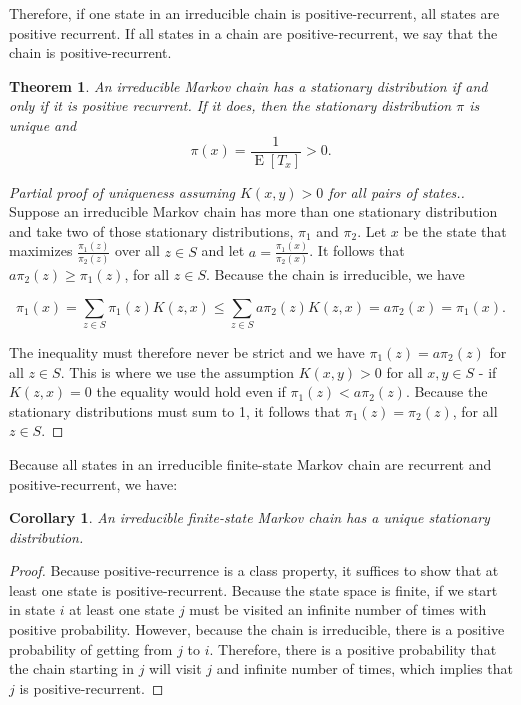 \documentclass{book}
\theoremstyle{plain}%
\newtheorem{theorem}{Theorem}[section]
\newtheorem{corollary}{Corollary}[section]
\theoremstyle{definition}
\DeclareMathOperator{\E}{E}
\begin{document}
Therefore, if one state in an irreducible chain is positive-recurrent, all states are positive recurrent. If all states in a chain are positive-recurrent, we say that the chain is positive-recurrent.

\begin{theorem} An irreducible Markov chain has a stationary distribution if and only if it is positive recurrent. If it does, then the stationary distribution $\pi$ is unique and 
$$\pi(x) = \frac{1}{\E[T_x]} > 0.$$
\end{theorem}

\begin{proof}[Partial proof of uniqueness assuming $K(x,y) > 0$ for all pairs of states.]
Suppose an irreducible Markov chain has more than one stationary distribution and take two of those stationary distributions, $\pi_1$ and $\pi_2$. Let $x$ be the state that maximizes $\frac{\pi_1(z)}{\pi_2(z)}$ over all $z \in S$ and let $a = \frac{\pi_1(x)}{\pi_2(x)}$.  It follows that $a\pi_2(z) \geq \pi_1(z)$, for all $z \in S$. Because the chain is irreducible, we have 

$$\pi_1(x) = \sum_{z \in S} \pi_1(z) K(z,x) \leq \sum_{z \in S} a\pi_2(z) K(z,x) = a\pi_2(x) = \pi_1(x).$$

The inequality must therefore never be strict and we have $\pi_1(z) = a\pi_2(z)$ for all $z \in S$. This is where we use the assumption $K(x,y) > 0$ for all $x, y \in S$ - if $K(z, x) = 0$ the equality would hold even if $\pi_1(z) < a\pi_2(z)$. Because the stationary distributions must sum to 1, it follows that $\pi_1(z) = \pi_2(z)$, for all $z \in S$.
\end{proof}

Because all states in an irreducible finite-state Markov chain are recurrent and positive-recurrent, we have:

\begin{corollary} An irreducible finite-state Markov chain has a unique stationary distribution. 
\end{corollary}

\begin{proof} Because positive-recurrence is a class property, it suffices to show that at least one state is positive-recurrent. Because the state space is finite, if we start in state $i$ at least one state $j$ must be visited an infinite number of times with positive probability. However, because the chain is irreducible, there is a positive probability of getting from $j$ to $i$. Therefore, there is a positive probability that the chain starting in $j$ will visit $j$ and infinite number of times, which implies that $j$ is positive-recurrent.
\end{proof}
\end{document}
